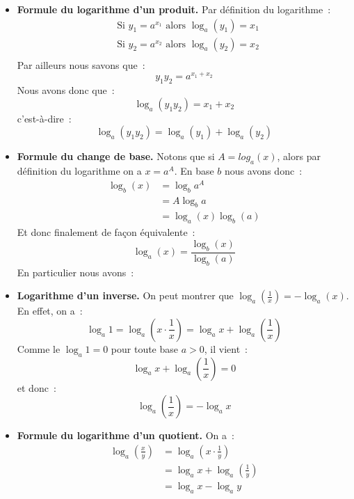 \documentclass[10pt,notheorems]{beamer}
\theoremstyle{plain}
\theoremstyle{definition} %
\begin{document}
\begin{notes}

  \begin{itemize}

  \item \textbf{Formule du logarithme d'un produit.} Par définition du logarithme~:
    \begin{eqnarray*}
      &\text{Si } y_1 = a^{x_1} \text{ alors } \log_a(y_1) = x_1\\
      &\text{Si } y_2 = a^{x_2} \text{ alors } \log_a(y_2) = x_2\\
    \end{eqnarray*}
    Par ailleurs nous savons que~:
    \[
      y_1y_2 = a^{x_1+x_2}
    \]
    Nous avons donc que~:
    \[
      \log_a(y_1y_2) = x_1 + x_2
    \]
    c'est-à-dire~:
    \[
      \log_a(y_1y_2) = \log_a(y_1) + \log_a(y_2)
    \]

  \item \textbf{Formule du change de base.} Notons que si $A = log_a(x)$, alors par définition du logarithme on a $x = a^A$. En base $b$ nous avons donc~:
    \[
      \begin{split}
        \log_b(x) &= \log_b a^A\\
        &= A\log_b a\\
        &= \log_a(x)\log_b(a)
      \end{split}
    \]
    Et donc finalement de façon équivalente~:
    \[
      \log_a(x) = \frac{\log_b(x)}{\log_b(a)}
    \]
    En particulier nous avons~:

  \item \textbf{Logarithme d'un inverse.} On peut montrer que $\log_a \left(\frac{1}{x}\right) = - \log_a(x)$. En effet, on a~:
    \[
      \log_a1 = \log_a \left(x\cdot\frac{1}{x}\right) = \log_a x + \log_a \left(\frac{1}{x}\right)
    \]
    Comme le $\log_a 1 = 0$ pour toute base $a>0$, il vient~:
    \[
      \log_a x + \log_a \left(\frac{1}{x}\right) = 0
    \]
    et donc~:
    \[
      \log_a \left(\frac{1}{x}\right) = -\log_a x
    \]

  \item \textbf{Formule du logarithme d'un quotient.} On a~:
    \[
      \begin{split}
        \log_a \left(\frac{x}{y}\right) &= \log_a \left(x\cdot\frac{1}{y}\right)\\
        &= \log_a x + \log_a \left(\frac{1}{y}\right)\\
        &= \log_a x - \log_a y\\
      \end{split}
    \]

  \end{itemize}

\end{notes}
\end{document}

